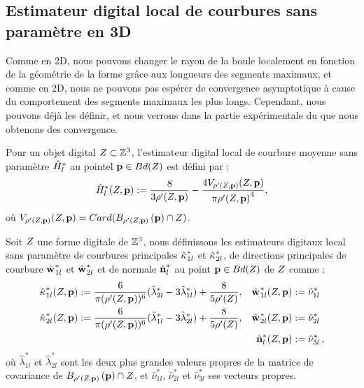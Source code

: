 \subsection{Estimateur digital local de courbures sans paramètre en 3D}
%
Comme en 2D, nous pouvons changer le rayon de la boule localement en fonction de la géométrie de la forme grâce aux longueurs des segments maximaux, et comme en 2D, nous ne pouvons pas espérer de convergence asymptotique à cause du comportement des segments maximaux les plus longs. Cependant, nous pouvons déjà les définir, et nous verrons dans la partie expérimentale du  que nous obtenons des convergence.
%
\begin{definition}
  Pour un objet digital $Z \subset \mathbb{Z}^3$, l'estimateur digital local de
  courbure moyenne sans paramètre $\hat{H}^{*}_{l}$ au pointel $\mathbf{p} \in
  Bd({Z})$ est défini par :
  \begin{equation}
    \hat{H}^{*}_{l}( Z, \mathbf{p} ) := \frac{8}{3 {\rho'(Z, \mathbf{p})}} - \frac{4 V_{{\rho'(Z, \mathbf{p})}}(Z, \mathbf{p})}{\pi{{\rho'(\ensuremath{Z}, \ensuremath{\mathbf{p}})}}^4} ,
    \label{def:curvature-estimator-3d-mean-pfl}
  \end{equation}
  où $V_{\rho'(Z, \mathbf{p})}(Z, \mathbf{p}) = Card(B_{\rho'(Z, \mathbf{p})}\left(\mathbf{p}\right) \cap Z)$.
\end{definition}
%
\begin{definition}
  Soit $Z$ une forme digitale de $\mathbb{Z}^3$, nous définissons les estimateurs
  digitaux local sans paramètre de courbures principales $\hat{\kappa_{}}_{1l}^{*}$ et
  $\hat{\kappa_{}}_{2l}^{*}$, de directions principales de courbure $\hat{\mathbf{w}_{}}_{1l}^{*}$ et
  $\hat{\mathbf{w}_{}}_{2l}^{*}$ et de normale $\hat{\mathbf{n}{}}^{*}_{l}$ au point $\mathbf{p} \in
  Bd({Z})$ de $Z$ comme :
  \begin{align}
      \hat{\kappa_{}}_{1l}^{*}(Z, \mathbf{p})  &:= \frac{6}{\pi (\rho'(Z, \mathbf{p}))^6}(\hat{\lambda}^{*}_{2l} - 3\hat{\lambda}^{*}_{1l}) + \frac{8}{5 \rho'(Z)},
      &\hat{\mathbf{w}_{}}_{1l}^{*}(Z, \mathbf{p}) &:= \hat{\nu}^{*}_{1l} \\
      \hat{\kappa_{}}_{2l}^{*}(Z, \mathbf{p}) &:= \frac{6}{\pi (\rho'(Z, \mathbf{p}))^6}(\hat{\lambda}^{*}_{1l} - 3\hat{\lambda}^{*}_{2l}) + \frac{8}{5 \rho'(Z)},
      &\hat{\mathbf{w}_{}}_{2l}^{*}(Z, \mathbf{p}) &:= \hat{\nu}^{*}_{2l}\\
      & &\hat{\mathbf{n}{}}^{*}_{l}(Z, \mathbf{p}) &:=\hat{\nu}^{*}_{3l}\,,
  \end{align}
  où $\hat{\lambda}^{*}_{1l}$ et $\hat{\lambda}^{*}_{2l}$ sont les deux plus grandes
  valeurs propres de la matrice de covariance de $B_{{\rho'(Z, \mathbf{p})}}\left(\mathbf{p}\right)
  \cap Z$, et $ \hat{\nu}^{*}_{1l}$, $\hat{\nu}^{*}_{2l}$ et $\hat{\nu}^{*}_{3l}$
  ses vecteurs propres.
  \label{def:curvature-estimator-3d-k1k2-pfl}
\end{definition}
%
